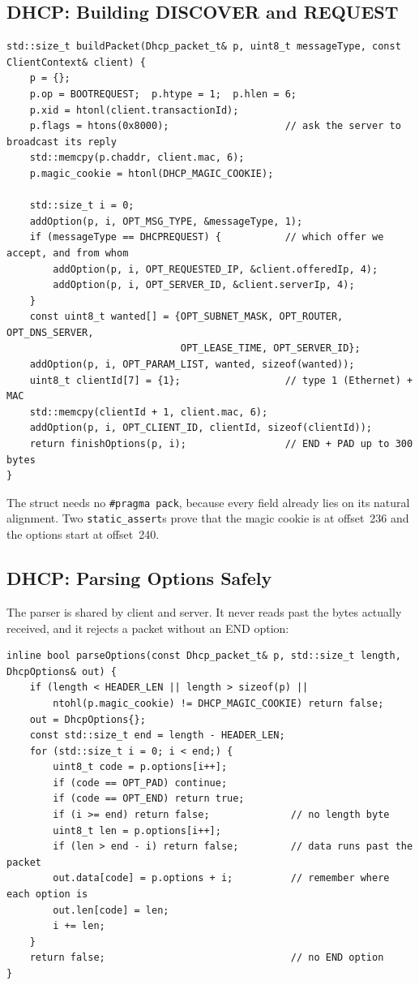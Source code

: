 \documentclass[11pt]{article}
\begin{document}
\subsection{DHCP: Building DISCOVER and REQUEST}
\begin{lstlisting}
std::size_t buildPacket(Dhcp_packet_t& p, uint8_t messageType, const ClientContext& client) {
    p = {};
    p.op = BOOTREQUEST;  p.htype = 1;  p.hlen = 6;
    p.xid = htonl(client.transactionId);
    p.flags = htons(0x8000);                    // ask the server to broadcast its reply
    std::memcpy(p.chaddr, client.mac, 6);
    p.magic_cookie = htonl(DHCP_MAGIC_COOKIE);

    std::size_t i = 0;
    addOption(p, i, OPT_MSG_TYPE, &messageType, 1);
    if (messageType == DHCPREQUEST) {           // which offer we accept, and from whom
        addOption(p, i, OPT_REQUESTED_IP, &client.offeredIp, 4);
        addOption(p, i, OPT_SERVER_ID, &client.serverIp, 4);
    }
    const uint8_t wanted[] = {OPT_SUBNET_MASK, OPT_ROUTER, OPT_DNS_SERVER,
                              OPT_LEASE_TIME, OPT_SERVER_ID};
    addOption(p, i, OPT_PARAM_LIST, wanted, sizeof(wanted));
    uint8_t clientId[7] = {1};                  // type 1 (Ethernet) + MAC
    std::memcpy(clientId + 1, client.mac, 6);
    addOption(p, i, OPT_CLIENT_ID, clientId, sizeof(clientId));
    return finishOptions(p, i);                 // END + PAD up to 300 bytes
}
\end{lstlisting}
The struct needs no \texttt{\#pragma pack}, because every field already lies on its
natural alignment. Two \texttt{static\_assert}s prove that the magic cookie is at
offset~236 and the options start at offset~240.

\subsection{DHCP: Parsing Options Safely}
The parser is shared by client and server. It never reads past the bytes actually
received, and it rejects a packet without an END option:
\begin{lstlisting}
inline bool parseOptions(const Dhcp_packet_t& p, std::size_t length, DhcpOptions& out) {
    if (length < HEADER_LEN || length > sizeof(p) ||
        ntohl(p.magic_cookie) != DHCP_MAGIC_COOKIE) return false;
    out = DhcpOptions{};
    const std::size_t end = length - HEADER_LEN;
    for (std::size_t i = 0; i < end;) {
        uint8_t code = p.options[i++];
        if (code == OPT_PAD) continue;
        if (code == OPT_END) return true;
        if (i >= end) return false;              // no length byte
        uint8_t len = p.options[i++];
        if (len > end - i) return false;         // data runs past the packet
        out.data[code] = p.options + i;          // remember where each option is
        out.len[code] = len;
        i += len;
    }
    return false;                                // no END option
}
\end{lstlisting}
\end{document}
